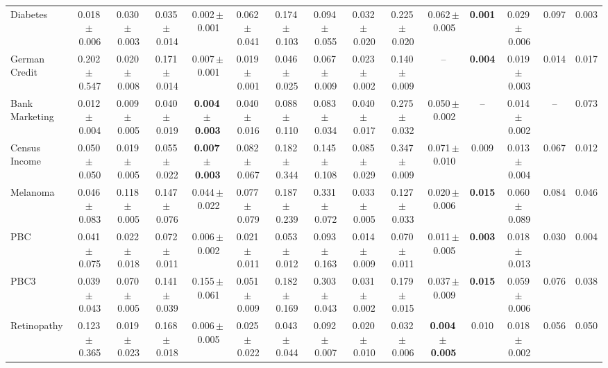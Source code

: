 \documentclass[8pt]{extarticle}
\begin{document}
\begin{longtable}{l*{14}{c}}
Diabetes & 0.018\,$\pm$\,0.006 & 0.030\,$\pm$\,0.003 & 0.035\,$\pm$\,0.014 & 0.002\,$\pm$\,0.001 & 0.062\,$\pm$\,0.041 & 0.174\,$\pm$\,0.103 & 0.094\,$\pm$\,0.055 & 0.032\,$\pm$\,0.020 & 0.225\,$\pm$\,0.020 & 0.062\,$\pm$\,0.005 & \textbf{0.001} & 0.029\,$\pm$\,0.006 & 0.097 & 0.003 \\
German Credit & 0.202\,$\pm$\,0.547 & 0.020\,$\pm$\,0.008 & 0.171\,$\pm$\,0.014 & 0.007\,$\pm$\,0.001 & 0.019\,$\pm$\,0.001 & 0.046\,$\pm$\,0.025 & 0.067\,$\pm$\,0.009 & 0.023\,$\pm$\,0.002 & 0.140\,$\pm$\,0.009 & -- & \textbf{0.004} & 0.019\,$\pm$\,0.003 & 0.014 & 0.017 \\
Bank Marketing & 0.012\,$\pm$\,0.004 & 0.009\,$\pm$\,0.005 & 0.040\,$\pm$\,0.019 & \textbf{0.004\,$\pm$\,0.003} & 0.040\,$\pm$\,0.016 & 0.088\,$\pm$\,0.110 & 0.083\,$\pm$\,0.034 & 0.040\,$\pm$\,0.017 & 0.275\,$\pm$\,0.032 & 0.050\,$\pm$\,0.002 & -- & 0.014\,$\pm$\,0.002 & -- & 0.073 \\
Census Income & 0.050\,$\pm$\,0.050 & 0.019\,$\pm$\,0.005 & 0.055\,$\pm$\,0.022 & \textbf{0.007\,$\pm$\,0.003} & 0.082\,$\pm$\,0.067 & 0.182\,$\pm$\,0.344 & 0.145\,$\pm$\,0.108 & 0.085\,$\pm$\,0.029 & 0.347\,$\pm$\,0.009 & 0.071\,$\pm$\,0.010 & 0.009 & 0.013\,$\pm$\,0.004 & 0.067 & 0.012 \\
Melanoma & 0.046\,$\pm$\,0.083 & 0.118\,$\pm$\,0.005 & 0.147\,$\pm$\,0.076 & 0.044\,$\pm$\,0.022 & 0.077\,$\pm$\,0.079 & 0.187\,$\pm$\,0.239 & 0.331\,$\pm$\,0.072 & 0.033\,$\pm$\,0.005 & 0.127\,$\pm$\,0.033 & 0.020\,$\pm$\,0.006 & \textbf{0.015} & 0.060\,$\pm$\,0.089 & 0.084 & 0.046 \\
PBC & 0.041\,$\pm$\,0.075 & 0.022\,$\pm$\,0.018 & 0.072\,$\pm$\,0.011 & 0.006\,$\pm$\,0.002 & 0.021\,$\pm$\,0.011 & 0.053\,$\pm$\,0.012 & 0.093\,$\pm$\,0.163 & 0.014\,$\pm$\,0.009 & 0.070\,$\pm$\,0.011 & 0.011\,$\pm$\,0.005 & \textbf{0.003} & 0.018\,$\pm$\,0.013 & 0.030 & 0.004 \\
PBC3 & 0.039\,$\pm$\,0.043 & 0.070\,$\pm$\,0.005 & 0.141\,$\pm$\,0.039 & 0.155\,$\pm$\,0.061 & 0.051\,$\pm$\,0.009 & 0.182\,$\pm$\,0.169 & 0.303\,$\pm$\,0.043 & 0.031\,$\pm$\,0.002 & 0.179\,$\pm$\,0.015 & 0.037\,$\pm$\,0.009 & \textbf{0.015} & 0.059\,$\pm$\,0.006 & 0.076 & 0.038 \\
Retinopathy & 0.123\,$\pm$\,0.365 & 0.019\,$\pm$\,0.023 & 0.168\,$\pm$\,0.018 & 0.006\,$\pm$\,0.005 & 0.025\,$\pm$\,0.022 & 0.043\,$\pm$\,0.044 & 0.092\,$\pm$\,0.007 & 0.020\,$\pm$\,0.010 & 0.032\,$\pm$\,0.006 & \textbf{0.004\,$\pm$\,0.005} & 0.010 & 0.018\,$\pm$\,0.002 & 0.056 & 0.050 \\

\end{longtable}
\end{document}
